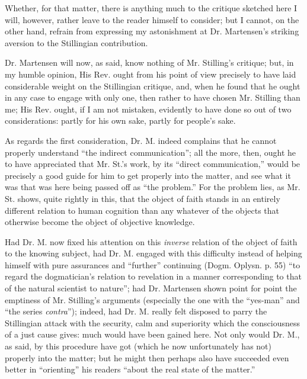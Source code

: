 \documentclass[12pt,a4paper,openany]{book}
\newcommand{\opage}[1]{\marginnote{\footnotesize\textit{[#1]}}}
\begin{document}
Whether, for that matter, there is anything much to
\setcounter{footnote}{0}%
\opage{24}the critique sketched here I will, however, rather leave to
the reader himself to consider; but I cannot, on the other hand, refrain
from expressing my astonishment at Dr. Martensen's striking
aversion to the Stillingian contribution.

Dr. Martensen will now, as said, know nothing of Mr.
Stilling's critique; but, in my humble opinion, His
Rev. ought from his point of view precisely to have laid considerable weight
on the Stillingian critique, and, when he found that he
ought in any case to engage with only one, then rather
to have chosen Mr. Stilling than me; His Rev. ought,
if I am not mistaken, evidently to have done so out of two considerations:
partly for his own sake, partly for people's sake.

As regards the first consideration, Dr. M. indeed complains
that he cannot properly understand ``the indirect communication''; all the
more, then, ought he to have appreciated that Mr. St.'s
work, by its ``direct communication,'' would be precisely
a good guide for him to get properly into the matter, and
see what it was that was here being passed off as ``the problem.'' For
the problem lies, as Mr. St. shows, quite rightly in this,
that the object of faith stands in an entirely different relation to
human cognition than any whatever of the objects
that otherwise become the object of objective knowledge.

Had Dr. M. now fixed his attention on this
\emph{inverse} relation of the object of faith to the knowing subject,
had Dr. M. engaged with this difficulty instead of
helping himself with pure assurances and ``further'' continuing
(Dogm. Oplysn. p. 55) ``to regard the dogmatician's
relation to revelation in a manner corresponding to that of the natural scientist
to nature''; had Dr. Martensen shown point for
point the emptiness of Mr. Stilling's arguments
\setcounter{footnote}{0}%
\opage{25}(especially the one with the ``yes-man'' and ``the series \textit{contra}''); indeed, had
Dr. M. really felt disposed to parry the Stillingian
attack with the security, calm and superiority which
the consciousness of a just cause gives: much would have been
gained here. Not only would Dr. M., as said, by this
procedure have got (which he now unfortunately has not)
properly into the matter; but he might then perhaps also have
succeeded even better in ``orienting'' his readers ``about
the real state of the matter.''
\end{document}
